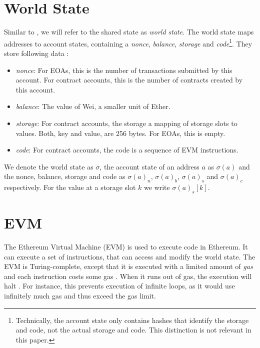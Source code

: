 \documentclass[draft,final]{vutinfth} %
\begin{document}
\section{World State}

Similar to \cite{wood_ethereum_2024}, we will refer to the shared state as \emph{world state}. The world state maps addresses to account states, containing a \emph{nonce}, \emph{balance}, \emph{storage} and \emph{code}\footnote{Technically, the account state only contains hashes that identify the storage and code, not the actual storage and code. This distinction is not relevant in this paper.}. They store following data \cite{wood_ethereum_2024}:

\begin{itemize}
    \item \emph{nonce}: For EOAs, this is the number of transactions submitted by this account. For contract accounts, this is the number of contracts created by this account.
    \item \emph{balance}: The value of Wei, a smaller unit of Ether.
    \item \emph{storage}: For contract accounts, the storage a mapping of storage slots to values. Both, key and value, are 256 bytes. For EOAs, this is empty.
    \item \emph{code}: For contract accounts, the code is a sequence of EVM instructions.
\end{itemize}

We denote the world state as $\sigma$, the account state of an address $a$ as $\sigma(a)$ and the nonce, balance, storage and code as $\sigma(a)_n$, $\sigma(a)_b$, $\sigma(a)_s$ and $\sigma(a)_c$ respectively. For the value at a storage slot $k$ we write $\sigma(a)_s[k]$.

\section{EVM}

The Ethereum Virtual Machine (EVM) is used to execute code in Ethereum. It can execute a set of instructions, that can access and modify the world state. The EVM is Turing-complete, except that it is executed with a limited amount of \emph{gas} and each instruction costs some gas \cite{wood_ethereum_2024}. When it runs out of gas, the execution will halt \cite[p.14]{wood_ethereum_2024}. For instance, this prevents execution of infinite loops, as it would use infinitely much gas and thus exceed the gas limit.
\end{document}
